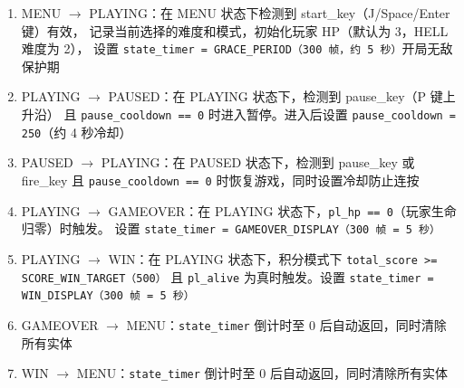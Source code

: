 \documentclass[12pt,a4paper]{ctexart}
\begin{document}
\begin{enumerate}[label=(\arabic*)]
    \item MENU $\rightarrow$ PLAYING：在 MENU 状态下检测到 start\_key（J/Space/Enter 键）有效，
    记录当前选择的难度和模式，初始化玩家 HP（默认为 3，HELL 难度为 2），
    设置 \texttt{state\_timer = GRACE\_PERIOD（300 帧，约 5 秒）}开局无敌保护期
    \item PLAYING $\rightarrow$ PAUSED：在 PLAYING 状态下，检测到 pause\_key（P 键上升沿）
    且 \texttt{pause\_cooldown == 0} 时进入暂停。进入后设置 \texttt{pause\_cooldown = 250}（约 4 秒冷却）
    \item PAUSED $\rightarrow$ PLAYING：在 PAUSED 状态下，检测到 pause\_key 或 fire\_key 且
    \texttt{pause\_cooldown == 0} 时恢复游戏，同时设置冷却防止连按
    \item PLAYING $\rightarrow$ GAMEOVER：在 PLAYING 状态下，\texttt{pl\_hp == 0}（玩家生命归零）时触发。
    设置 \texttt{state\_timer = GAMEOVER\_DISPLAY（300 帧 = 5 秒）}
    \item PLAYING $\rightarrow$ WIN：在 PLAYING 状态下，积分模式下 \texttt{total\_score >= SCORE\_WIN\_TARGET（500）}
    且 \texttt{pl\_alive} 为真时触发。设置 \texttt{state\_timer = WIN\_DISPLAY（300 帧 = 5 秒）}
    \item GAMEOVER $\rightarrow$ MENU：\texttt{state\_timer} 倒计时至 0 后自动返回，同时清除所有实体
    \item WIN $\rightarrow$ MENU：\texttt{state\_timer} 倒计时至 0 后自动返回，同时清除所有实体
\end{enumerate}
\end{document}
